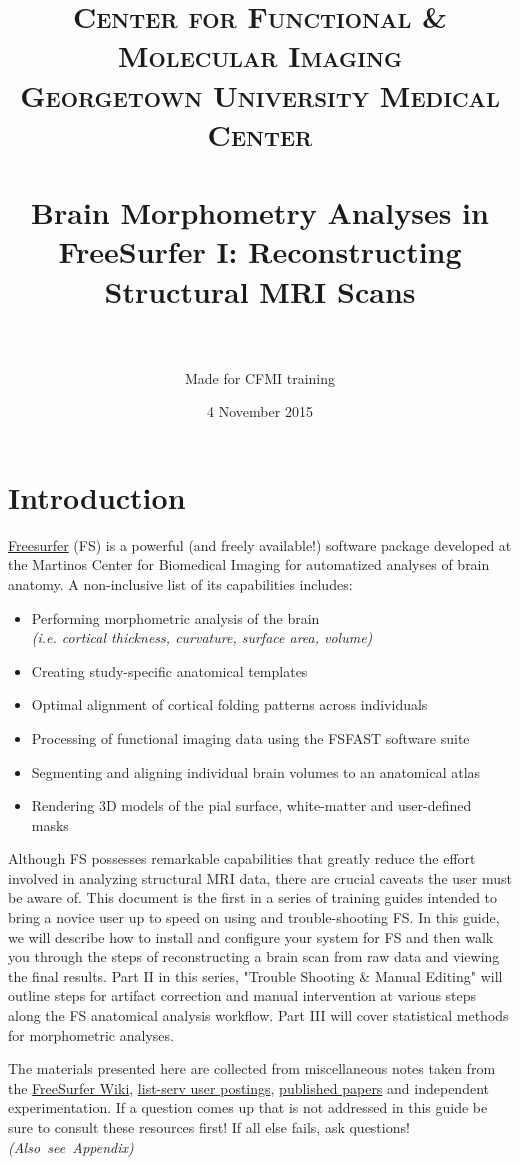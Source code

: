 \documentclass[paper=a4, fontsize=11pt]{scrartcl} %
\title{	
\normalfont \normalsize 
\textsc{Center for Functional \& Molecular Imaging \\ Georgetown University Medical Center} \\ [25pt] %
\horrule{0.5pt} \\[0.4cm] %
\huge Brain Morphometry Analyses in FreeSurfer I:  Reconstructing Structural MRI Scans  \\ %
\horrule{2pt} \\[0.5cm] %
}
\author{Made for CFMI training} %
\date{\normalsize 4 November 2015} %
\numberwithin{equation}{section} %
\numberwithin{figure}{section} %
\numberwithin{table}{section} %
\begin{document}
\maketitle %

\lstset{escapechar=\@} %
\section{Introduction}  \href{https://surfer.nmr.mgh.harvard.edu/}{Freesurfer} (FS) is a powerful (and freely available!) software package developed at the Martinos Center for Biomedical Imaging for automatized analyses of brain anatomy.  A non-inclusive list of its capabilities includes:
\begin{itemize}
	\item Performing morphometric analysis of the brain \\  \textit{(i.e. cortical thickness, curvature, surface area, volume)}
	\item Creating study-specific anatomical templates
	\item Optimal alignment of cortical folding patterns across individuals
	\item Processing of functional imaging data using the FSFAST software suite
	\item Segmenting and aligning individual brain volumes to an anatomical atlas
	\item Rendering 3D models of the pial surface, white-matter and user-defined masks
\end{itemize}

Although FS possesses remarkable capabilities that greatly reduce the effort involved in analyzing structural MRI data, there are crucial caveats the user must be aware of. This document is the first in a series of training guides intended to bring a novice user up to speed on using and trouble-shooting FS.  In this guide, we will describe how to install and configure your system for FS and then walk you through the steps of reconstructing a brain scan from raw data and viewing the final results.  Part II in this series, "Trouble Shooting \& Manual Editing" will outline steps for artifact correction and manual intervention at various steps along the FS anatomical analysis workflow. Part III will cover statistical methods for morphometric analyses.

The materials presented here are collected from miscellaneous notes taken from the \href{https://surfer.nmr.mgh.harvard.edu/fswiki}{FreeSurfer Wiki}, \href{http://www.mail-archive.com/freesurfer@nmr.mgh.harvard.edu/}{list-serv user postings}, \href{https://www.zotero.org/freesurfer}{published papers} and independent experimentation.  If a question comes up that is not addressed in this guide be sure to consult these resources first! If all else fails, ask questions! \mbox{\textit{(Also see Appendix)}}
\end{document}
